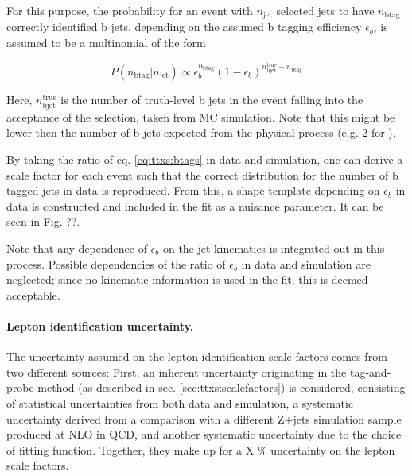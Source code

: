 For this purpose, the probability for an event with $n_{\mathrm{jet}}$ selected jets to have $n_{\mathrm{b tag}}$ correctly identified b jets, depending on the assumed b tagging efficiency $\epsilon_b$, is assumed to be a multinomial of the form

\begin{equation}
\label{eq:ttxs:btags}
    P (n_{\mathrm{b tag}} | n_{\mathrm{jet}}) \propto \epsilon_b^{n_{\mathrm{b tag}}} (1 - \epsilon_b)^{n_{\mathrm{b jet}}^{\mathrm{true}} - n_{\mathrm{b tag}}}
\end{equation}

Here, $n_{\mathrm{b jet}}^{\mathrm{true}}$ is the number of truth-level b jets in the event falling into the acceptance of the selection, taken from MC simulation. Note that this might be lower then the number of b jets expected from the physical process (e.g. 2 for \ttbar). 

By taking the ratio of eq. \ref{eq:ttxs:btags} in data and simulation, one can derive a scale factor for each event such that the correct distribution for the number of b tagged jets in data is reproduced. From this, a shape template depending on $\epsilon_b$ in data is constructed and included in the fit as a nuisance parameter. It can be seen in Fig. ??.

Note that any dependence of $\epsilon_b$ on the jet kinematics is integrated out in this process. Possible dependencies of the ratio of $\epsilon_b$ in data and simulation are neglected; since no kinematic information is used in the fit, this is deemed acceptable.

\paragraph{Lepton identification uncertainty.}


The uncertainty assumed on the lepton identification scale factors comes from two different sources: First, an inherent uncertainty originating in the tag-and-probe method (as described in sec. \ref{sec:ttxs:scalefactors}) is considered, consisting of statistical uncertainties from both data and simulation, a systematic uncertainty derived from a comparison with a different Z+jets simulation sample produced at NLO in QCD, and another systematic uncertainty due to the choice of fitting function. Together, they make up for a X \% uncertainty on the lepton scale factors.

